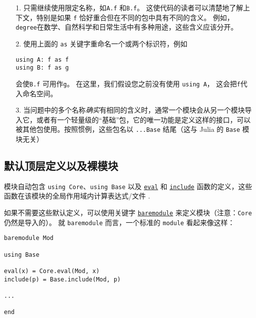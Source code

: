 \begin{itemize}
\item[1. ] 只需继续使用限定名称，如\texttt{A.f} 和\texttt{B.f}。 这使代码的读者可以清楚地了解上下文，特别是如果 \texttt{f} 恰好重合但在不同的包中具有不同的含义。 例如，\texttt{degree}在数学、自然科学和日常生活中有多种用途，这些含义应该分开。


\item[2. ] 使用上面的 \texttt{as} 关键字重命名一个或两个标识符，例如


\begin{verbatim}
using A: f as f
using B: f as g
\end{verbatim}

会使\texttt{B.f} 可用作\texttt{g}。 在这里，我们假设您之前没有使用 \texttt{using A}， 这会把\texttt{f}代入命名空间。


\item[3. ] 当问题中的多个名称\emph{确实}有相同的含义时，通常一个模块会从另一个模块导入它，或者有一个轻量级的“基础”包，它的唯一功能是定义这样的接口，可以被其他包使用。按照惯例，这些包名以 \texttt{...Base} 结尾（这与 Julia 的 \texttt{Base} 模块无关）

\end{itemize}


\hypertarget{3653095448809961286}{}


\subsection{默认顶层定义以及裸模块}



模块自动包含 \texttt{using Core}、\texttt{using Base} 以及 \hyperlink{7507639810592563424}{\texttt{eval}} 和 \hyperlink{7507443674556842580}{\texttt{include}} 函数的定义，这些函数在该模块的全局作用域内计算表达式/文件 .



如果不需要这些默认定义，可以使用关键字 \hyperlink{13329108222158426840}{\texttt{baremodule}} 来定义模块（注意：\texttt{Core} 仍然是导入的）。 就 \texttt{baremodule} 而言，一个标准的 \texttt{module} 看起来像这样：




\begin{lstlisting}
baremodule Mod

using Base

eval(x) = Core.eval(Mod, x)
include(p) = Base.include(Mod, p)

...

end
\end{lstlisting}



